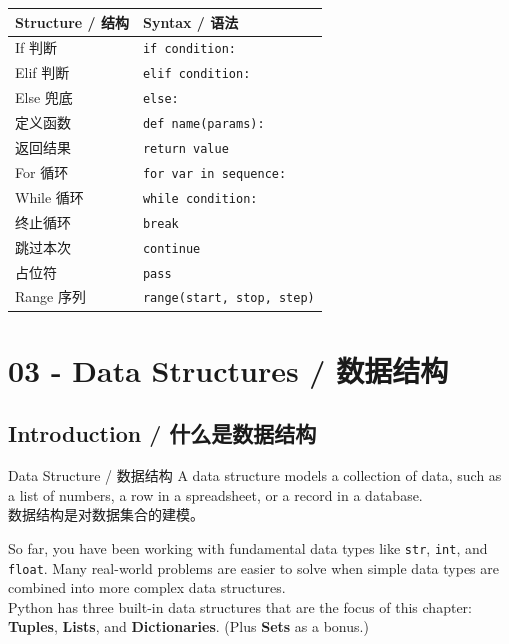 \documentclass[11pt,a4paper]{report}
\let\oldtexttt\texttt
\renewcommand{\texttt}[1]{\textcolor{mainblue}{\oldtexttt{#1}}}
\begin{document}
\medskip
\centering
\small
\renewcommand{\arraystretch}{1.3}
\begin{tabular}{@{}ll@{}}
\toprule
\textbf{Structure / 结构} & \textbf{Syntax / 语法} \\ \midrule
If 判断 & \texttt{if condition:} \\
Elif 判断 & \texttt{elif condition:} \\
Else 兜底 & \texttt{else:} \\
定义函数 & \texttt{def name(params):} \\
返回结果 & \texttt{return value} \\
For 循环 & \texttt{for var in sequence:} \\
While 循环 & \texttt{while condition:} \\
终止循环 & \texttt{break} \\
跳过本次 & \texttt{continue} \\
占位符 & \texttt{pass} \\
Range 序列 & \texttt{range(start, stop, step)} \\ \bottomrule
\end{tabular}
\medskip



\chapter{03 - Data Structures / 数据结构}



\section{Introduction / 什么是数据结构}

\begin{concept}{Data Structure / 数据结构}
    A data structure models a collection of data, such as a list of numbers, a row in a spreadsheet, or a record in a database. \\
    数据结构是对数据集合的建模。

    So far, you have been working with fundamental data types like \texttt{str}, \texttt{int}, and \texttt{float}. Many real-world problems are easier to solve when simple data types are combined into more complex data structures. \\
    Python has three built-in data structures that are the focus of this chapter: \textbf{Tuples}, \textbf{Lists}, and \textbf{Dictionaries}. (Plus \textbf{Sets} as a bonus.)
\end{concept}
\end{document}
